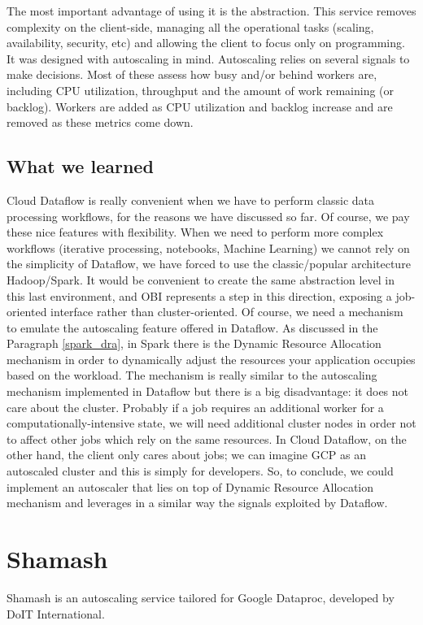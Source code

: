 \documentclass[12pt,twoside,cucitura]{toptesi}
\begin{document}
The most important advantage of using it is the abstraction. This service removes complexity on the client-side, managing all the operational tasks (scaling, availability, security, etc) and allowing the client to focus only on programming. It was designed with autoscaling in mind. Autoscaling relies on several signals to make decisions. Most of these assess how busy and/or behind workers are, including CPU utilization, throughput and the amount of work remaining (or backlog). Workers are added as CPU utilization and backlog increase and are removed as these metrics come down.

\subsection{What we learned}
Cloud Dataflow is really convenient when we have to perform classic data processing workflows, for the reasons we have discussed so far. Of course, we pay these nice features with flexibility. When we need to perform more complex workflows (iterative processing, notebooks, Machine Learning) we cannot rely on the simplicity of Dataflow, we have forced to use the classic/popular architecture Hadoop/Spark. It would be convenient to create the same abstraction level in this last environment, and OBI represents a step in this direction, exposing a job-oriented interface rather than cluster-oriented. Of course, we need a mechanism to emulate the autoscaling feature offered in Dataflow. As discussed in the Paragraph \ref{spark_dra}, in Spark there is the Dynamic Resource Allocation mechanism in order to dynamically adjust the resources your application occupies based on the workload. The mechanism is really similar to the autoscaling mechanism implemented in Dataflow but there is a big disadvantage: it does not care about the cluster. Probably if a job requires an additional worker for a computationally-intensive state, we will need additional cluster nodes in order not to affect other jobs which rely on the same resources. In Cloud Dataflow, on the other hand, the client only cares about jobs; we can imagine GCP as an autoscaled cluster and this is simply for developers. So, to conclude, we could implement an autoscaler that lies on top of Dynamic Resource Allocation mechanism and leverages in a similar way the signals exploited by Dataflow.

\section{Shamash}
Shamash \cite{shamash} is an autoscaling service tailored for Google Dataproc, developed by DoIT International. 
\end{document}
